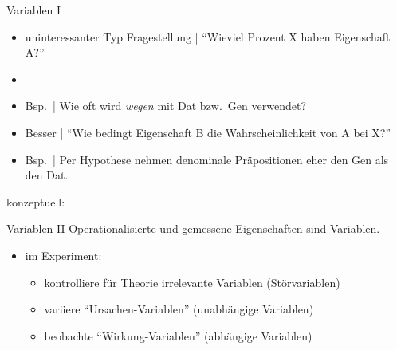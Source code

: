 \begin{frame}
  {Variablen I}
  \begin{itemize}[<+->]
    \item uninteressanter Typ Fragestellung | "`Wieviel Prozent X haben Eigenschaft A?"'
    \item {}
    \item Bsp.\ | Wie oft wird \textit{wegen} mit Dat bzw.\ Gen verwendet?
      \Halbzeile
    \item Besser | "`Wie bedingt Eigenschaft B die Wahrscheinlichkeit von A bei X?"'
    \item Bsp.\ | Per Hypothese nehmen denominale Präpositionen eher den Gen als den Dat.
  \end{itemize}
  \pause
  \Halbzeile
  \begin{center}
    konzeptuell:
  \end{center}
\end{frame}

\begin{frame}
  {Variablen II}
  Operationalisierte und gemessene Eigenschaften sind \alert{Variablen}.\\
  \Zeile
  \begin{itemize}[<+->]
    \item im Experiment:
      \Halbzeile
      \begin{itemize}[<+->]
	\item \alert{kontrolliere} für Theorie irrelevante Variablen (\alert{Störvariablen})
          \Viertelzeile
	\item \alert{variiere} "`Ursachen-Variablen"' (\alert{unabhängige Variablen})
          \Viertelzeile
	\item \alert{beobachte} "`Wirkung-Variablen"' (\alert{abhängige Variablen})
      \end{itemize}
  \end{itemize}
\end{frame}

